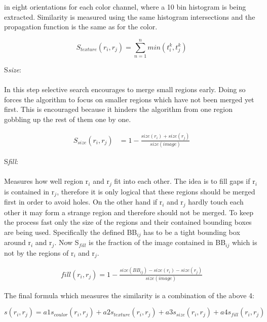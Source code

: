 in eight orientations for each color channel, where a 10 bin histogram is being extracted. Similarity is measured
using the same histogram intersections and the propagation function is the same as for the color.\cite{selectivesearch}
\begin{center}
    \begin{equation*}
        S_{texture}(r_i,r_j) = \sum_{n=1}^{n} min(t_i^{k},t_j^{k})
    \end{equation*}\cite{selectivesearch}
\end{center}
{S}\emph{size}: \\ \\
In this step selective search encourages to merge small regions early. Doing so forces the algorithm to focus
on smaller regions which have not been merged yet first. This is encouraged because it hinders the algorithm from one
region gobbling up the rest of them one by one.\cite{selectivesearch}
\begin{center}
    \begin{equation*}
        \begin{split}
            S_{size}(r_i,r_j) & = 1 - \frac{size(r_i)+size(r_j)}{size(image)}
        \end{split}
    \end{equation*}\cite{selectivesearch}
\end{center}
{S}\emph{fill}: \\ \\
Measures how well region r$_i$ and r$_j$ fit into each other. The idea is to fill gaps if r{$_i$} is contained in
r$_j$, therefore it is only logical that these regions should be merged first in order to avoid holes. On the other hand
if r$_i$ and r$_j$ hardly touch each other it may form a strange region and therefore should not be merged. To keep
the process fast only the size of the regions and their contained bounding boxes are being used. Specifically the defined
BB$_{ij}$ has to be a tight bounding box around r$_i$ and r$_j$. Now S$_{fill}$ is the fraction of the image
contained in BB$_{ij}$ which is not by the regions of r$_i$ and r$_j$.\cite{selectivesearch}
\begin{center}
    \begin{equation*}
        \begin{split}
            fill(r_i, r_j) = 1 - \frac{size(BB_{ij}) - size(r_i) - size(r_j)}{size(image)}
        \end{split}
    \end{equation*}\cite{selectivesearch}
\end{center}
The final formula which measures the similarity is a combination of the above 4:
\begin{center}
    \begin{equation*}
        s(r_i,r_j) = a1s_{coulor}(r_i,r_j) + a2s_{texture}(r_i,r_j) + a3s_{size}(r_i,r_j) + a4s_{fill}(r_i,r_j)
    \end{equation*}\cite{selectivesearch}
\end{center}
\newpage
